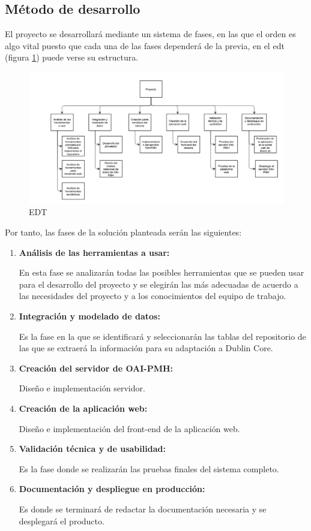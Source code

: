 \subsection{Método de desarrollo}

El proyecto se desarrollará mediante un sistema de fases, en las que el orden es algo vital puesto que cada una de las fases dependerá de la previa, en el \acrfull{edt} (figura \ref{fig:edt}) puede verse su estructura.

\begin{figure}[!htp]
	\centering
	\includegraphics[angle=90, scale=.5]{fig/edt}
	\caption{EDT}\label{fig:edt}
\end{figure}

Por tanto, las fases de la solución planteada serán las siguientes:

\begin{enumerate}
	\item \textbf{Análisis de las herramientas a usar:}

	En esta fase se analizarán todas las posibles herramientas que se pueden usar para el desarrollo del proyecto y se elegirán las más adecuadas de acuerdo a las necesidades del proyecto y a los conocimientos del equipo de trabajo.
	\item \textbf{Integración y modelado de datos:}

	Es la fase en la que se identificará y seleccionarán las tablas del repositorio de las que se extraerá la información para su adaptación a Dublin Core.
	\item \textbf{Creación del servidor de OAI-PMH:}

	Diseño e implementación servidor.
	\item \textbf{Creación de la aplicación web:}

	Diseño e implementación del front-end de la aplicación web. 
	\item \textbf{Validación técnica y de usabilidad:}

	Es la fase donde se realizarán las pruebas finales del sistema completo.
	\item \textbf{Documentación y despliegue en producción:}

	Es donde se terminará de redactar la documentación necesaria y se desplegará el producto.
\end{enumerate}